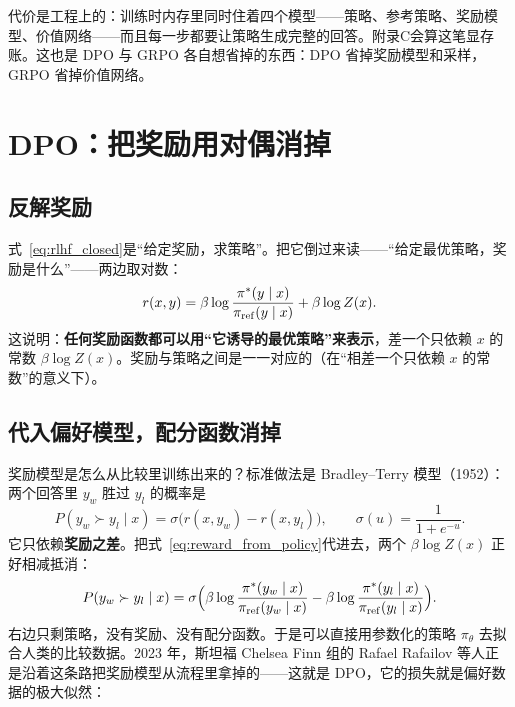 代价是工程上的：训练时内存里同时住着四个模型——策略、参考策略、奖励模型、价值网络——而且每一步都要让策略生成完整的回答。附录C会算这笔显存账。这也是 DPO 与 GRPO 各自想省掉的东西：DPO 省掉奖励模型和采样，GRPO 省掉价值网络。

\section{DPO：把奖励用对偶消掉}

\subsection{反解奖励}

式~\eqref{eq:rlhf_closed}是“给定奖励，求策略”。把它倒过来读——“给定最优策略，奖励是什么”——两边取对数：
\begin{equation}
    r(x, y) = \beta \log\frac{\pi^*(y \mid x)}{\pi_{\rm ref}(y \mid x)} + \beta \log Z(x).
    \label{eq:reward_from_policy}
\end{equation}
这说明：\textbf{任何奖励函数都可以用“它诱导的最优策略”来表示}，差一个只依赖 $x$ 的常数 $\beta\log Z(x)$。奖励与策略之间是一一对应的（在“相差一个只依赖 $x$ 的常数”的意义下）。

\subsection{代入偏好模型，配分函数消掉}

奖励模型是怎么从比较里训练出来的？标准做法是 Bradley--Terry 模型（1952）：两个回答里 $y_w$ 胜过 $y_l$ 的概率是
\begin{equation}
    P(y_w \succ y_l \mid x) = \sigma\big(r(x, y_w) - r(x, y_l)\big), \qquad \sigma(u) = \frac{1}{1 + e^{-u}}.
\end{equation}
它只依赖\textbf{奖励之差}。把式~\eqref{eq:reward_from_policy}代进去，两个 $\beta\log Z(x)$ 正好相减抵消：
\begin{equation}
    P(y_w \succ y_l \mid x) = \sigma\Big(\beta\log\frac{\pi^*(y_w\mid x)}{\pi_{\rm ref}(y_w\mid x)} - \beta\log\frac{\pi^*(y_l\mid x)}{\pi_{\rm ref}(y_l\mid x)}\Big).
\end{equation}
右边只剩策略，没有奖励、没有配分函数。于是可以直接用参数化的策略 $\pi_\theta$ 去拟合人类的比较数据。2023 年，斯坦福 Chelsea Finn 组的 Rafael Rafailov 等人正是沿着这条路把奖励模型从流程里拿掉的——这就是 DPO，它的损失就是偏好数据的极大似然：


